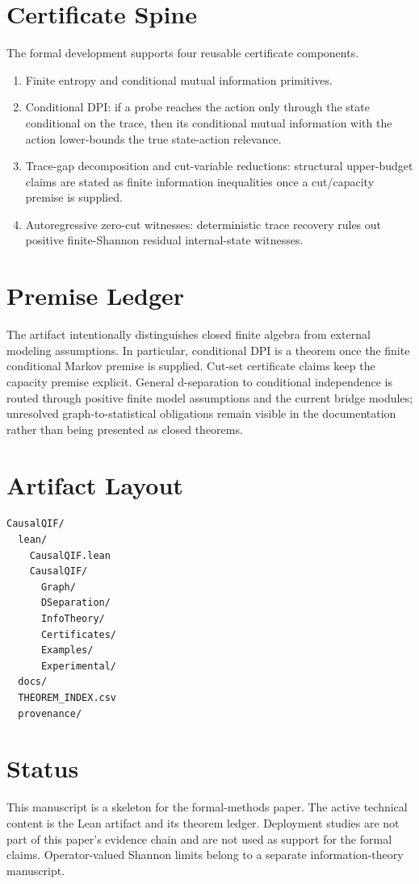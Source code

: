 \documentclass{article}
\begin{document}
\section{Certificate Spine}

The formal development supports four reusable certificate components.

\begin{enumerate}
  \item Finite entropy and conditional mutual information primitives.
  \item Conditional DPI: if a probe reaches the action only through the state
  conditional on the trace, then its conditional mutual information with the
  action lower-bounds the true state-action relevance.
  \item Trace-gap decomposition and cut-variable reductions: structural
  upper-budget claims are stated as finite information inequalities once a
  cut/capacity premise is supplied.
  \item Autoregressive zero-cut witnesses: deterministic trace recovery rules
  out positive finite-Shannon residual internal-state witnesses.
\end{enumerate}

\section{Premise Ledger}

The artifact intentionally distinguishes closed finite algebra from external
modeling assumptions.  In particular, conditional DPI is a theorem once the
finite conditional Markov premise is supplied.  Cut-set certificate claims keep
the capacity premise explicit.  General d-separation to conditional
independence is routed through positive finite model assumptions and the
current bridge modules; unresolved graph-to-statistical obligations remain
visible in the documentation rather than being presented as closed theorems.

\section{Artifact Layout}

\begin{verbatim}
CausalQIF/
  lean/
    CausalQIF.lean
    CausalQIF/
      Graph/
      DSeparation/
      InfoTheory/
      Certificates/
      Examples/
      Experimental/
  docs/
  THEOREM_INDEX.csv
  provenance/
\end{verbatim}

\section{Status}

This manuscript is a skeleton for the formal-methods paper.  The active
technical content is the Lean artifact and its theorem ledger.  Deployment
studies are not part of this paper's evidence chain and are not used as support
for the formal claims.
Operator-valued Shannon limits belong to a separate information-theory
manuscript.
\end{document}
